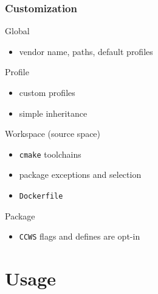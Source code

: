 \documentclass[hyperref={colorlinks=false, breaklinks=true},11pt]{beamer}
\begin{document}
\begin{frame}
    \frametitle{Customization}

    \begin{block}{Global}
        \begin{itemize}
            \item vendor name, paths, default profiles
        \end{itemize}
    \end{block}

    \begin{block}{Profile}
        \begin{itemize}
            \item custom profiles
            \item simple inheritance
        \end{itemize}
    \end{block}

    \begin{block}{Workspace (source space)}
        \begin{itemize}
            \item \texttt{cmake} toolchains
            \item package exceptions and selection
            \item \texttt{Dockerfile}
        \end{itemize}
    \end{block}

    \begin{block}{Package}
        \begin{itemize}
            \item \texttt{CCWS} flags and defines are opt-in
        \end{itemize}
    \end{block}
\end{frame}


\section{Usage}
\end{document}
